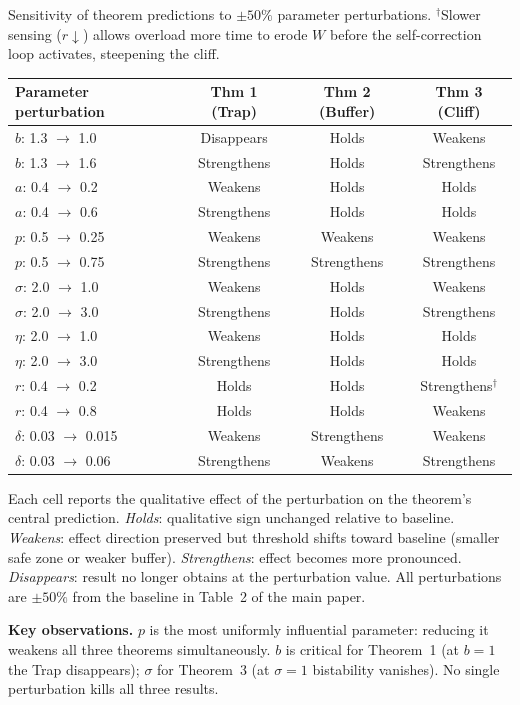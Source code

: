 \documentclass[msom,dblanonrev]{informs4}
\begin{document}
\begin{table}
\TABLE
{Sensitivity of theorem predictions to $\pm 50\%$ parameter perturbations. $^{\dagger}$Slower sensing ($r\downarrow$) allows overload more time to erode $W$ before the self-correction loop activates, steepening the cliff.\label{tab:ec:sensitivity}}
{\begin{tabular}{@{}lccc@{}}
\toprule
Parameter perturbation & Thm 1 (Trap) & Thm 2 (Buffer) & Thm 3 (Cliff) \\
\midrule
$b$: 1.3 $\to$ 1.0 & Disappears & Holds & Weakens \\
$b$: 1.3 $\to$ 1.6 & Strengthens & Holds & Strengthens \\
$a$: 0.4 $\to$ 0.2 & Weakens & Holds & Holds \\
$a$: 0.4 $\to$ 0.6 & Strengthens & Holds & Holds \\
$p$: 0.5 $\to$ 0.25 & Weakens & Weakens & Weakens \\
$p$: 0.5 $\to$ 0.75 & Strengthens & Strengthens & Strengthens \\
$\sigma$: 2.0 $\to$ 1.0 & Weakens & Holds & Weakens \\
$\sigma$: 2.0 $\to$ 3.0 & Strengthens & Holds & Strengthens \\
$\eta$: 2.0 $\to$ 1.0 & Weakens & Holds & Holds \\
$\eta$: 2.0 $\to$ 3.0 & Strengthens & Holds & Holds \\
$r$: 0.4 $\to$ 0.2 & Holds & Holds & Strengthens$^{\dagger}$ \\
$r$: 0.4 $\to$ 0.8 & Holds & Holds & Weakens \\
$\delta$: 0.03 $\to$ 0.015 & Weakens & Strengthens & Weakens \\
$\delta$: 0.03 $\to$ 0.06 & Strengthens & Weakens & Strengthens \\
\bottomrule
\end{tabular}}
{Each cell reports the qualitative effect of the perturbation on the theorem's central prediction. \emph{Holds}: qualitative sign unchanged relative to baseline. \emph{Weakens}: effect direction preserved but threshold shifts toward baseline (smaller safe zone or weaker buffer). \emph{Strengthens}: effect becomes more pronounced. \emph{Disappears}: result no longer obtains at the perturbation value. All perturbations are $\pm 50\%$ from the baseline in Table~2 of the main paper.}
\end{table}

\textbf{Key observations.} $p$ is the most uniformly influential parameter: reducing it weakens all three theorems simultaneously. $b$ is critical for Theorem~1 (at $b = 1$ the Trap disappears); $\sigma$ for Theorem~3 (at $\sigma = 1$ bistability vanishes). No single perturbation kills all three results.
\end{document}

